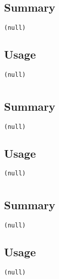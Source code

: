 \section{}
\subsection{Summary}
\begin{verbatim}
(null)
\end{verbatim}
\subsection{Usage}
\begin{verbatim}
(null)
\end{verbatim}


\section{}
\subsection{Summary}
\begin{verbatim}
(null)
\end{verbatim}
\subsection{Usage}
\begin{verbatim}
(null)
\end{verbatim}


\section{}
\subsection{Summary}
\begin{verbatim}
(null)
\end{verbatim}
\subsection{Usage}
\begin{verbatim}
(null)
\end{verbatim}


\section{}
